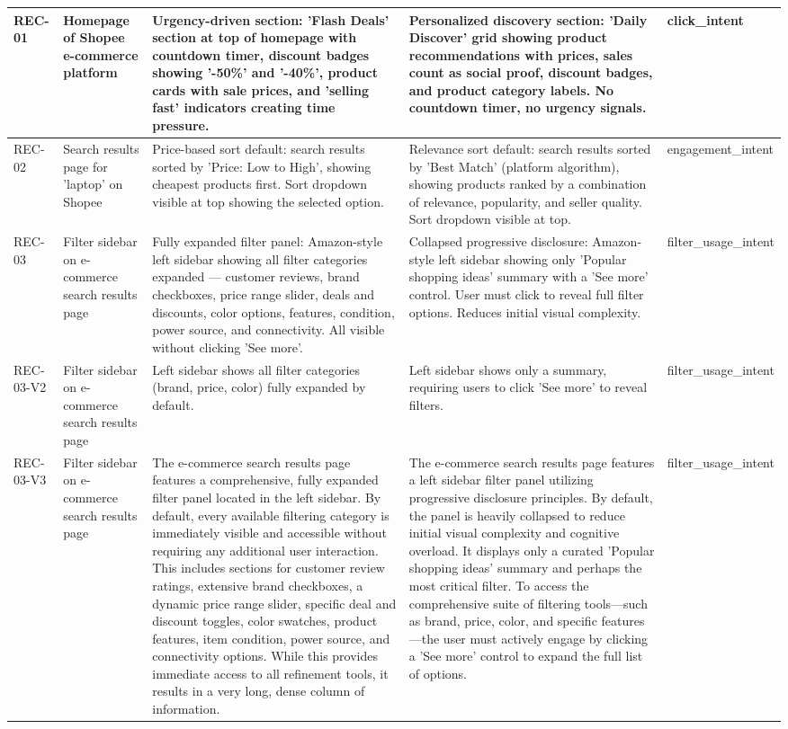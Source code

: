 \begin{table}[h]
\begin{tabular}{p{1.5cm} p{3.5cm} p{4cm} p{4cm} p{2cm}}
\midrule
REC-01 & Homepage of Shopee e-commerce platform & Urgency-driven section: 'Flash Deals' section at top of homepage with countdown timer, discount badges showing '-50\%' and '-40\%', product cards with sale prices, and 'selling fast' indicators creating time pressure. & Personalized discovery section: 'Daily Discover' grid showing product recommendations with prices, sales count as social proof, discount badges, and product category labels. No countdown timer, no urgency signals. & click_intent \\
\midrule
REC-02 & Search results page for 'laptop' on Shopee & Price-based sort default: search results sorted by 'Price: Low to High', showing cheapest products first. Sort dropdown visible at top showing the selected option. & Relevance sort default: search results sorted by 'Best Match' (platform algorithm), showing products ranked by a combination of relevance, popularity, and seller quality. Sort dropdown visible at top. & engagement_intent \\
\midrule
REC-03 & Filter sidebar on e-commerce search results page & Fully expanded filter panel: Amazon-style left sidebar showing all filter categories expanded — customer reviews, brand checkboxes, price range slider, deals and discounts, color options, features, condition, power source, and connectivity. All visible without clicking 'See more'. & Collapsed progressive disclosure: Amazon-style left sidebar showing only 'Popular shopping ideas' summary with a 'See more' control. User must click to reveal full filter options. Reduces initial visual complexity. & filter_usage_intent \\
\midrule
REC-03-V2 & Filter sidebar on e-commerce search results page & Left sidebar shows all filter categories (brand, price, color) fully expanded by default. & Left sidebar shows only a summary, requiring users to click 'See more' to reveal filters. & filter_usage_intent \\
\midrule
REC-03-V3 & Filter sidebar on e-commerce search results page & The e-commerce search results page features a comprehensive, fully expanded filter panel located in the left sidebar. By default, every available filtering category is immediately visible and accessible without requiring any additional user interaction. This includes sections for customer review ratings, extensive brand checkboxes, a dynamic price range slider, specific deal and discount toggles, color swatches, product features, item condition, power source, and connectivity options. While this provides immediate access to all refinement tools, it results in a very long, dense column of information. & The e-commerce search results page features a left sidebar filter panel utilizing progressive disclosure principles. By default, the panel is heavily collapsed to reduce initial visual complexity and cognitive overload. It displays only a curated 'Popular shopping ideas' summary and perhaps the most critical filter. To access the comprehensive suite of filtering tools—such as brand, price, color, and specific features—the user must actively engage by clicking a 'See more' control to expand the full list of options. & filter_usage_intent \\

\end{tabular}
\end{table}
